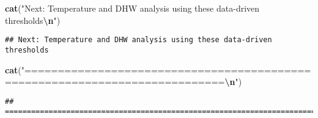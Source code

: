 \documentclass[
]{article}
\newenvironment{Shaded}{\begin{snugshade}}{\end{snugshade}}
\newcommand{\FunctionTok}[1]{\textcolor[rgb]{0.13,0.29,0.53}{\textbf{#1}}}
\newcommand{\NormalTok}[1]{#1}
\newcommand{\SpecialCharTok}[1]{\textcolor[rgb]{0.81,0.36,0.00}{\textbf{#1}}}
\newcommand{\StringTok}[1]{\textcolor[rgb]{0.31,0.60,0.02}{#1}}
\begin{document}
\begin{Shaded}
\begin{Highlighting}[]
\FunctionTok{cat}\NormalTok{(}\StringTok{"Next: Temperature and DHW analysis using these data{-}driven thresholds}\SpecialCharTok{\textbackslash{}n}\StringTok{"}\NormalTok{)}
\end{Highlighting}
\end{Shaded}

\begin{verbatim}
## Next: Temperature and DHW analysis using these data-driven thresholds
\end{verbatim}

\begin{Shaded}
\begin{Highlighting}[]
\FunctionTok{cat}\NormalTok{(}\StringTok{"============================================================================}\SpecialCharTok{\textbackslash{}n}\StringTok{"}\NormalTok{)}
\end{Highlighting}
\end{Shaded}

\begin{verbatim}
## ============================================================================
\end{verbatim}
\end{document}

